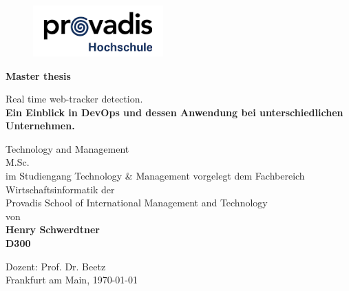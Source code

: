 \begin{titlepage}
	\strut
	\hfill
	\begin{center}
	\begin{figure}
	\begin{center}
	\includegraphics[width=5cm]{./images/provadis.png}
	\end{center}
	\end{figure}
			\large 
			\textbf{Master thesis}
		
		\vspace{0.5cm}
		\Huge
		\begin{spacing}{.9}
			Real time web-tracker detection.\\
			\vspace{0.5cm}
			\large
			\textbf{Ein Einblick in DevOps und dessen Anwendung bei unterschiedlichen Unternehmen.} \\
		\end{spacing}
		\vspace{3cm}
		\small 
		
			Technology and Management \\
			\vspace{0.2cm}
			M.Sc. \\
			\vspace{0.2cm}
			im Studiengang Technology \& Management
		\vspace{1cm}
		\small
			vorgelegt dem Fachbereich Wirtschaftsinformatik der \\
			\vspace{0.1cm}
		Provadis School of International Management and Technology \\
		\vspace{0.1cm}
		von \\
		\vspace{1cm}
		\textbf{Henry Schwerdtner}\\
		\vspace{0.8cm}
		\textbf{D300}\\
		\vspace{2cm}
	 	\end{center}
		\vfill
		\begin{flushleft}
		Dozent: Prof. Dr. Beetz \\
		\vspace{2cm}
		Frankfurt am Main,  \today
		\end{flushleft}
\end{titlepage}

\shipout\null
